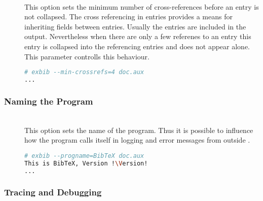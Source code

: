 \begin{description}
\item[ ]
\item[ ]
\item[ ] \ \\
  This option sets the minimum number of cross-references before an
  entry is not collapsed. The cross referencing in entries provides a
  means for inheriting fields between entries. Usually the entries are
  included in the output.  Nevertheless when there are only a few
  referenes to an entry this entry is collapsed into the referencing
  entries and does not appear alone. This parameter controlls this
  behaviour.
\begin{lstlisting}[language=sh]
# exbib --min-crossrefs=4 doc.aux
...
\end{lstlisting}

\end{description}

\subsubsection{Naming the Program}

\begin{description}
\item[ ]
\item[ ]
\item[ ]
\item[ ]\ \\
  This option sets the name of the program. Thus it is possible to
  influence how the program calls itself in logging and error messages
  from outside .
\begin{lstlisting}[language=sh,escapechar=!]
# exbib --progname=BibTeX doc.aux
This is BibTeX, Version !\Version!
...
\end{lstlisting}

\end{description}


\subsubsection{Tracing and Debugging}%
\label{sec:cli.debug}

